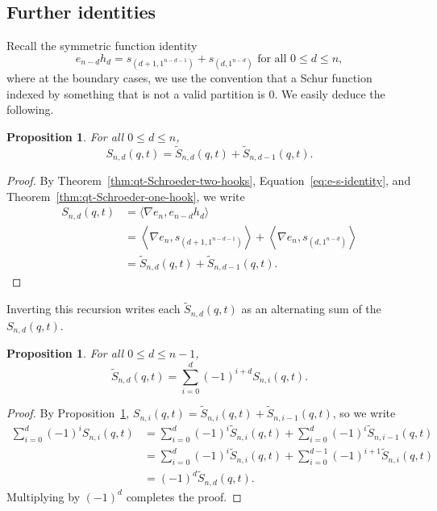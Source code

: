 \documentclass[11pt, noadjust, reqno]{amsart}
\newtheorem{proposition}[theorem]{Proposition}
\theoremstyle{definition}
\theoremstyle{remark}
\numberwithin{equation}{section}
\newcommand{\0}{\emptyset}
\begin{document}
\subsection{Further identities}
Recall the symmetric function identity 
\begin{equation}\label{eq:e-s-identity}
    e_{n-d}h_d = s_{(d+1,1^{n-d-1})} + s_{(d,1^{n-d})} \text{ for all } 0\leq d \leq n,
\end{equation}
where at the boundary cases, we use the convention that a Schur function indexed by something that is not a valid partition is $0$.
We easily deduce the following.
\begin{proposition}\label{prop:Schroder-splitting}
For all $0 \leq d \leq n$,
   \begin{equation} S_{n,d}(q,t) = \widetilde{S}_{n,d}(q,t)+\widetilde{S}_{n,d-1}(q,t). 
    \end{equation}
\end{proposition}

\begin{proof}
    By Theorem~\ref{thm:qt-Schroeder-two-hooks}, Equation~\eqref{eq:e-s-identity}, and Theorem~\ref{thm:qt-Schroeder-one-hook}, we write
    \begin{align*}
        S_{n,d}(q,t) &= \Big\langle \nabla e_n, e_{n-d}h_d \Big\rangle\\
        &=  \left\langle \nabla e_n, s_{(d+1,1^{n-d-1})} \right\rangle +\left\langle \nabla e_n, s_{(d,1^{n-d})} \right\rangle\\
        &= \widetilde{S}_{n,d}(q,t)+\widetilde{S}_{n,d-1}(q,t). 
    \end{align*}
\end{proof}

Inverting this recursion writes each $\widetilde{S}_{n,d}(q,t)$ as an alternating sum of the $S_{n,d}(q,t)$.
\begin{proposition}\label{prop:Schroder-alternating}
For all $0 \leq d \leq n-1$,
    \begin{equation*}
        \widetilde{S}_{n,d}(q,t)
        = \sum_{i=0}^{d}(-1)^{i+d} S_{n,i}(q,t).
    \end{equation*}
\end{proposition}

\begin{proof}
By Proposition~\ref{prop:Schroder-splitting}, $S_{n,i}(q,t) = \widetilde{S}_{n,i}(q,t)+\widetilde{S}_{n,i-1}(q,t)$, so we write
\begin{align*}
    \sum_{i=0}^d (-1)^i S_{n,i}(q,t)
    &= \sum_{i=0}^d (-1)^i \widetilde{S}_{n,i}(q,t) + \sum_{i=0}^d (-1)^i \widetilde{S}_{n,i-1}(q,t)\\
    &= \sum_{i=0}^d (-1)^i \widetilde{S}_{n,i}(q,t) + \sum_{i=0}^{d-1} (-1)^{i+1} \widetilde{S}_{n,i}(q,t)\\
    &= (-1)^d \widetilde{S}_{n,d}(q,t).
\end{align*}
Multiplying by $(-1)^d$ completes the proof.
\end{proof}
\end{document}

